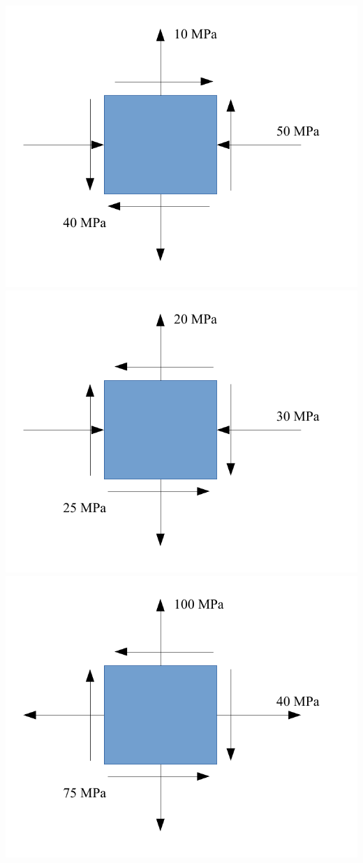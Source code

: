 \documentclass[
10pt,
a4paper,
openany,
svgnames,
]{book}
\begin{document}
\begin{exercises}
  \includegraphics[scale=0.7]{pictures/Static-body-load-analysis/plane-stress-exercise1}
  \includegraphics[scale=0.7]{pictures/Static-body-load-analysis/plane-stress-exercise2} \\
  \includegraphics[scale=0.7]{pictures/Static-body-load-analysis/plane-stress-exercise3}
\end{exercises}
\end{document}
